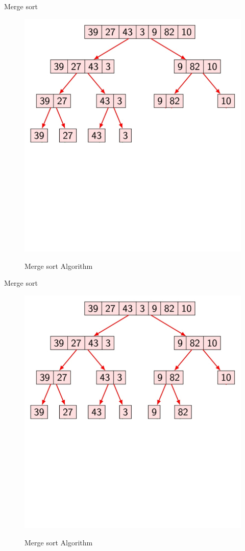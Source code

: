 \documentclass{beamer}
\begin{document}
\begin{frame}{Merge sort}
	\begin{figure}[h]
		\centering
		\includegraphics[scale=0.24]{IKEHS6.jpg}
		\label{fig:2}
		\caption{Merge sort Algorithm}
	\end{figure}
\end{frame}

\begin{frame}{Merge sort}
	\begin{figure}[h]
		\centering
		\includegraphics[scale=0.24]{IKEHS7.jpg}
		\label{fig:2}
		\caption{Merge sort Algorithm}
	\end{figure}
\end{frame}
\end{document}
